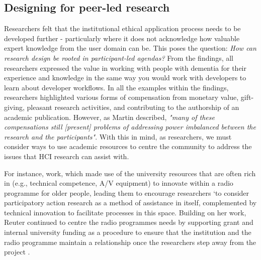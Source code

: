 \subsection{Designing for peer-led research}
\label{Discussion:PeerLedResearch}
Researchers felt that the institutional ethical application process needs to be developed further - particularly where it does not acknowledge how valuable expert knowledge from the user domain can be. This poses the question: \textit{How can research design be rooted in participant-led agendas?} From the findings, all researchers expressed the value in working with people with dementia for their experience and knowledge in the same way you would work with developers to learn about developer workflows. In all the examples within the findings, researchers highlighted various forms of compensation from monetary value, gift-giving, pleasant research activities, and contributing to the authorship of an academic publication. However, as Martin described, \textit{"many of these compensations still [present] problems of addressing power imbalanced between the research and the participants"}. With this in mind, as researchers, we must consider ways to use academic resources to centre the community to address the issues that HCI research can assist with.

For instance, \cite{reuter_older_2019} work, which made use of the university resources that are often rich in  (e.g., technical competence, A/V equipment) to innovate within a radio programme for older people, leading them to encourage researchers ‘to consider participatory action research as a method of assistance in itself, complemented by technical innovation to facilitate processes in this space. Building on her work, Reuter continued to centre the radio programmes needs by supporting grant and internal university funding as a procedure to ensure that the institution and the radio programme maintain a relationship once the researchers step away from the project \citep{reuter2021content}. 

